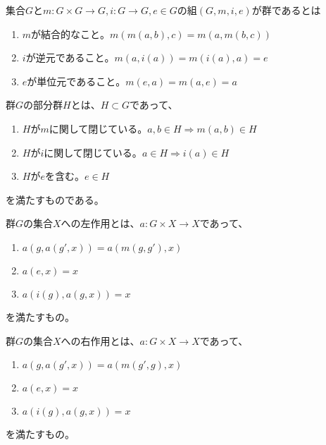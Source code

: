 \begin{definition}\label{group-def}
    \leanok
    集合$G$と$m:G\times G\to G, i:G\to G, e\in G$の組$(G,m,i,e)$が群であるとは
    \begin{enumerate}
        \item $m$が結合的なこと。$m(m(a,b),c)=m(a,m(b,c))$
        \item $i$が逆元であること。$m(a,i(a))=m(i(a),a)=e$
        \item $e$が単位元であること。$m(e,a)=m(a,e)=a$
    \end{enumerate}
\end{definition}

\begin{definition}\label{subgroup-def}
    \leanok
    群$G$の部分群$H$とは、$H\subset G$であって、
    \begin{enumerate}
        \item $H$が$m$に関して閉じている。$a,b\in H\Rightarrow m(a,b)\in H$
        \item $H$が$i$に関して閉じている。$a\in H\Rightarrow i(a)\in H$
        \item $H$が$e$を含む。$e\in H$
    \end{enumerate}
    を満たすものである。
\end{definition}


\begin{definition}\label{left-action-def}
    \leanok
    群$G$の集合$X$への左作用とは、$a:G\times X\to X$であって、
    \begin{enumerate}
        \item $a(g,a(g',x))=a(m(g,g'),x)$
        \item $a(e,x)=x$
        \item $a(i(g),a(g,x))=x$
    \end{enumerate}
    を満たすもの。
\end{definition}

\begin{definition}\label{right-action-def}
    群$G$の集合$X$への右作用とは、$a:G\times X\to X$であって、
    \begin{enumerate}
        \item $a(g,a(g',x))=a(m(g',g),x)$
        \item $a(e,x)=x$
        \item $a(i(g),a(g,x))=x$
    \end{enumerate}
    を満たすもの。
\end{definition}

